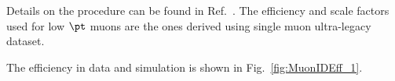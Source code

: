 Details on the procedure can be found in Ref.~\cite{AN-15-277}. 
The efficiency and scale 
factors used for low $\pt$ muons are the ones derived using single muon ultra-legacy dataset.

The efficiency in data and simulation is shown in Fig.~\ref{fig:MuonIDEff_1}. 
\begin{figure}[htbp]
  \begin{center}
     \\

\end{center}
\end{figure}
